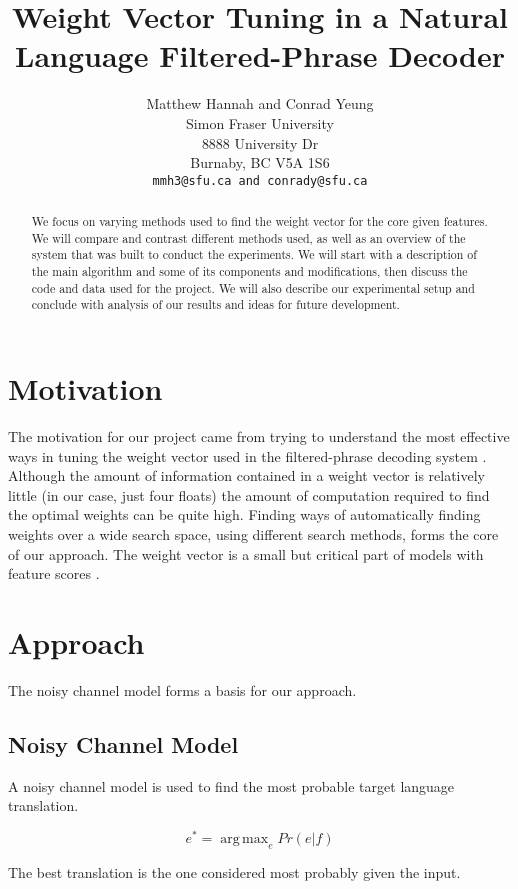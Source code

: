 \documentclass[11pt,letterpaper]{article}
\title{Weight Vector Tuning in a 
Natural Language Filtered-Phrase Decoder}
\author{Matthew Hannah {\normalfont and} Conrad Yeung \\
  Simon Fraser University \\
  8888 University Dr \\
  Burnaby, BC V5A 1S6 \\
  {\tt mmh3@sfu.ca {\normalfont and} conrady@sfu.ca}  \\}
\date{}
\DeclareMathOperator*{\argmax}{arg\,max}
\begin{document}
\maketitle
\begin{abstract}
We focus on varying methods used to find the weight vector for the core given features. We will compare and contrast different methods used, as well as an overview of the system that was built to conduct the experiments. We will start with a description of the main algorithm and some of its components and modifications, then discuss the code and data used for the project. We will also describe our experimental setup and conclude with analysis of our results and ideas for future development.
\end{abstract}

\section{Motivation}

The motivation for our project came from trying to understand the most effective ways in tuning the weight vector used in the filtered-phrase decoding system \cite{Collins:2013}. Although the amount of information contained in a weight vector is relatively little (in our case, just four floats) the amount of computation required to find the optimal weights can be quite high. Finding ways of automatically finding weights over a wide search space, using different search methods, forms the core of our approach. The weight vector is a small but critical part of models with feature scores \cite{HopkinsMay}.

\section{Approach}

The noisy channel model forms a basis for our approach.

\subsection{Noisy Channel Model}

A noisy channel model is used to find the most probable target language translation.

\begin{displaymath}
e^* = \argmax_e Pr(e|f)
\end{displaymath}

The best translation is the one considered most probably given the input.
\end{document}
